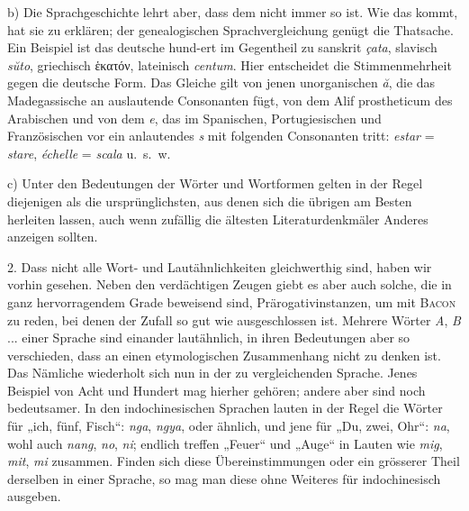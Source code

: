 \largerpage[-1]\label{III.I.I.2B1b}b) Die Sprachgeschichte lehrt aber, dass dem nicht immer so ist. Wie das kommt, hat sie zu erklären; der genealogischen Sprachvergleichung genügt die Thatsache. Ein Beispiel ist das deutsche hund-ert im Gegentheil zu sanskrit \textit{çata}, slavisch \textit{sŭto}, griechisch ἑκατόν, lateinisch \textit{centum}. Hier entscheidet die Stimmenmehrheit gegen die deutsche Form. Das Gleiche gilt von jenen unorganischen \textit{ă}, die das Madegassische an auslautende Consonanten fügt, von dem Alif prostheticum des Arabischen und von dem \textit{e}, das im Spanischen, Portugiesischen und Französischen vor ein anlautendes \textit{s} mit folgenden Consonanten tritt: \textit{estar} = \textit{stare}, \textit{échelle} = \textit{scala} u.~s.~w. 

\label{III.I.I.2B1c}c) Unter den Bedeutungen der Wörter und Wortformen gelten in der Regel diejenigen als die ursprünglichsten, aus denen sich die übrigen am Besten herleiten lassen, auch wenn zufällig die ältesten Literaturdenkmäler Anderes anzeigen sollten. 

\label{III.I.I.2B2}2. Dass nicht alle Wort- und Lautähnlichkeiten gleichwerthig sind, haben wir vorhin gesehen. Neben den verdächtigen Zeugen giebt es \label{fp.168} aber auch solche, \label{sp.158} die in ganz hervorragendem Grade beweisend sind, Prärogativinstanzen, um mit \textsc{Bacon} zu reden, bei denen der Zufall so gut wie ausgeschlossen ist. Mehrere Wörter \textit{A}, \textit{B} ... einer Sprache sind einander lautähnlich, in ihren Bedeutungen aber so verschieden, dass an einen etymologischen Zusammenhang nicht zu denken ist. Das Nämliche wiederholt sich nun in der zu vergleichenden Sprache. Jenes Beispiel von Acht und Hundert mag hierher gehören; andere aber sind noch bedeutsamer. In den indochinesischen Sprachen lauten in der Regel die Wörter für „ich, fünf, Fisch“: \textit{nga}, \textit{ngya}, oder ähnlich, und jene für „Du, zwei, Ohr“: \textit{na}, wohl auch \textit{nang}, \textit{no}, \textit{ni}; endlich treffen „Feuer“ und „Auge“ in Lauten wie \textit{mig}, \textit{mit}, \textit{mi} zusammen. Finden sich diese Übereinstimmungen oder ein grösserer Theil derselben in einer Sprache, so mag man diese ohne Weiteres für indochinesisch ausgeben.

